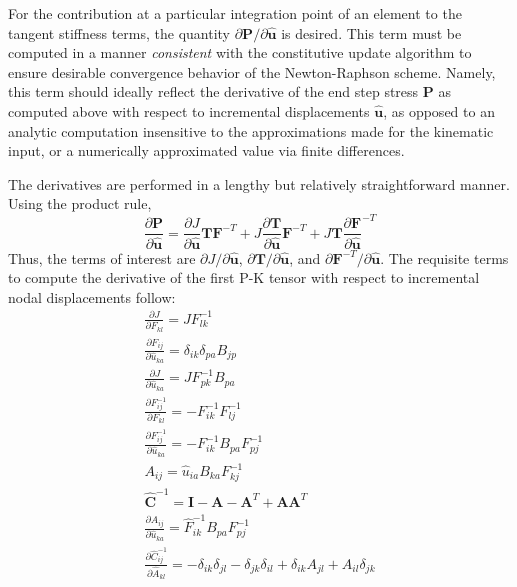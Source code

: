 For the contribution at a particular integration point of an element to the tangent stiffness terms, the quantity $\partial{\bm{P}}/\partial{\hat{\bm{u}}}$ is desired. This term must be computed in a manner \textit{consistent} with the constitutive update algorithm to ensure desirable convergence behavior of the Newton-Raphson scheme. Namely, this term should ideally reflect the derivative of the end step stress $\bm{P}$ as computed above with respect to incremental displacements $\hat{\bm{u}}$, as opposed to an analytic computation insensitive to the approximations made for the kinematic input, or a numerically approximated value via finite differences.

The derivatives are performed in a lengthy but relatively straightforward manner. Using the product rule,
\begin{equation}
\frac{\partial {\bm P}}{\partial \hat{{\bm u}}} = \frac{\partial J}{\partial \hat{\bm u}}{\bm T}{\bm F}^{-T} + J\frac{\partial {\bm T}}{\partial \hat{\bm u}}{\bm F}^{-T} + J{\bm T}\frac{\partial {\bm F}}{\partial \hat{\bm u}}^{-T}
\end{equation}
Thus, the terms of interest are ${\partial J}/{\partial \hat{\bm{u}}}$, ${\partial \bm{T}}/{\partial \hat{\bm{u}}}$, and ${\partial \bm{F}^{-T}}/{\partial \hat{\bm{u}}}$. The requisite terms to compute the derivative of the first P-K tensor with respect to incremental nodal displacements follow:
\begin{gather}
\frac{\partial J}{\partial F_{kl}} = JF_{lk}^{{-1}} \\
\frac{\partial F_{ij}}{\partial \hat{u}_{ka}} = \delta_{ik}\delta_{pa}B_{jp} \\
\frac{\partial J}{\partial \hat{u}_{ka}} = JF_{pk}^{-1}B_{pa} \\
\frac{\partial F_{ij}^{-1}}{\partial F_{kl}} = - F_{ik}^{-1}F_{lj}^{-1} \\
\frac{\partial F_{ij}^{-1}}{\partial \hat{u}_{ka}} = - F_{ik}^{-1}B_{pa}F_{pj}^{-1} \\
A_{ij} = \hat{u}_{ia}B_{ka}F^{-1}_{kj} \\
\hat{{\bm C}}^{-1} = {\bm I} - {\bm A} - {\bm A}^T + {\bm A}{\bm A}^T \\
\frac{\partial A_{ij}}{\partial \hat{u}_{ka}} = \hat{F}^{-1}_{ik}B_{pa}F^{-1}_{pj} \\
\frac{\partial \hat{C}^{-1}_{ij}}{\partial \hat{A}_{kl}} = -\delta_{ik}\delta_{jl} - \delta_{jk}\delta_{il} + \delta_{ik}A_{jl} + A_{il}\delta_{jk}
\end{gather}
